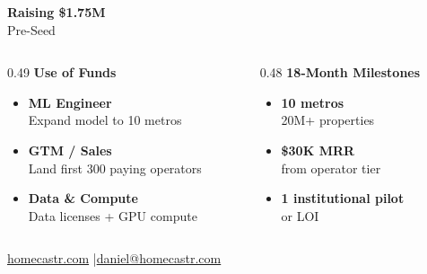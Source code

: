 \documentclass[aspectratio=169,12pt]{beamer}
\newcommand{\goldtext}[1]{{\color{hcGold}#1}}
\newcommand{\mutedtext}[1]{{\color{hcMuted}#1}}
\begin{document}
\begin{frame}[c]
\vspace{4pt}

\begin{center}
{\fontsize{36}{42}\selectfont\bfseries\color{hcGold} Raising \$1.75M}\\[8pt]
{\large Pre-Seed}
\end{center}

\vspace{10pt}

\begin{columns}[T]
\begin{column}{0.49\textwidth}
\textbf{Use of Funds}\\[6pt]
\begin{itemize}\setlength{\itemsep}{6pt}
  \item \textbf{ML Engineer}\\\mutedtext{Expand model to 10 metros}
  \item \textbf{GTM / Sales}\\\mutedtext{Land first 300 paying operators}
  \item \textbf{Data \& Compute}\\\mutedtext{Data licenses + GPU compute}
\end{itemize}
\end{column}
\begin{column}{0.48\textwidth}
\textbf{18-Month Milestones}\\[6pt]
\begin{itemize}\setlength{\itemsep}{6pt}
  \item \goldtext{\textbf{10 metros}}\\\mutedtext{20M+ properties}
  \item \goldtext{\textbf{\$30K MRR}}\\\mutedtext{from operator tier}
  \item \goldtext{\textbf{1 institutional pilot}}\\\mutedtext{or LOI}
\end{itemize}

\end{column}
\end{columns}

\vspace{4pt}
\begin{center}
\href{https://homecastr.com}{\goldtext{homecastr.com}} \quad|\quad \href{mailto:daniel@homecastr.com}{\mutedtext{daniel@homecastr.com}}
\end{center}
\end{frame}
\end{document}
